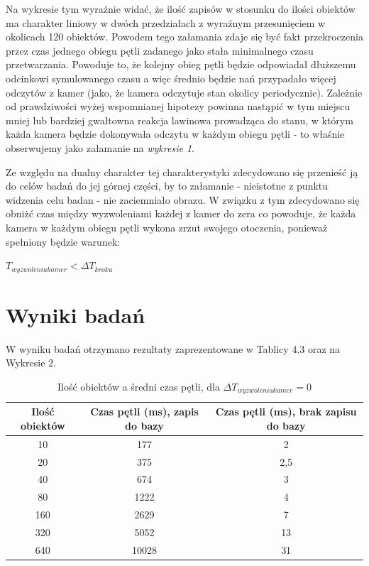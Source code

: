\par{
Na wykresie tym wyraźnie widać, że ilość zapisów w stosunku do ilości obiektów ma charakter liniowy w dwóch przedziałach z wyraźnym przesunięciem w okolicach 120 obiektów. Powodem tego załamania zdaje się być fakt przekroczenia przez czas jednego obiegu pętli zadanego jako stała minimalnego czasu przetwarzania.  Powoduje to, że kolejny obieg pętli będzie odpowiadał dłuższemu odcinkowi symulowanego czasu a więc średnio będzie nań przypadało więcej odczytów z kamer (jako, że kamera odczytuje stan okolicy periodycznie). Zależnie od prawdziwości wyżej wspomnianej hipotezy powinna nastąpić w tym miejscu mniej lub bardziej gwałtowna reakcja lawinowa prowadząca do stanu, w którym każda kamera będzie dokonywała odczytu w każdym obiegu pętli - to właśnie obserwujemy jako załamanie na \textit{wykresie 1}.
}
\par{
Ze względu na dualny charakter tej charakterystyki zdecydowano się przenieść ją do celów badań do jej górnej części, by to załamanie - nieistotne z punktu widzenia celu badan - nie zaciemniało obrazu. W związku z tym zdecydowano się obniżć czas między wyzwoleniami każdej z kamer do zera co powoduje, że każda kamera w każdym obiegu pętli wykona zrzut swojego otoczenia, ponieważ spełniony będzie warunek:
}
\par{
\begin{center}
$T_{wyzwolenia kamer} < \Delta T_{kroku}$
\end{center}
}

\section{Wyniki badań}
\par{
W wyniku badań otrzymano rezultaty zaprezentowane w Tablicy 4.3 oraz na Wykresie 2.
}

\par{
\begin{table}[t]
\caption{Ilość obiektów a średni czas pętli, dla $\Delta T_{wyzwolenia kamer} = 0$}
\label{Tabela 1}
\begin{center}
\begin{tabular}{|c|c|c|}
  \hline 
  \textbf{Ilość obiektów} & \textbf{Czas pętli (ms), zapis do bazy} & \textbf{Czas pętli (ms), brak zapisu do bazy}\\
  \hline
10 & 177 & 2 \\
20 & 375 & 2,5 \\
40 & 674 & 3 \\
80 & 1222 & 4 \\
160 & 2629 & 7 \\
320 & 5052 & 13 \\
640 & 10028 & 31 \\
  \hline  
\end{tabular}
\end{center}
\end{table}
}

